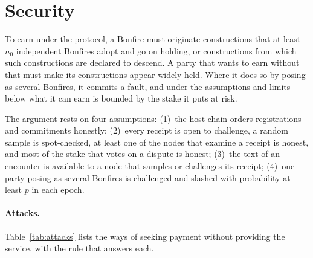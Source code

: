 \section{Security}\label{sec:security}

\begin{proposition}\label{prop:service}
To earn under the protocol, a Bonfire must originate constructions that at least $n_0$ independent Bonfires adopt
and go on holding, or constructions from which such constructions are declared to descend. A party that wants to
earn without that must make its constructions appear widely held. Where it does so by posing as several Bonfires,
it commits a fault, and under the assumptions and limits below what it can earn is bounded by the stake it puts at
risk.
\end{proposition}

The argument rests on four assumptions: (1)~the host chain orders registrations and commitments honestly; (2)~every
receipt is open to challenge, a random sample is spot-checked, at least one of the nodes that examine a receipt is
honest, and most of the stake that votes on a dispute is honest; (3)~the text of an encounter is available to a
node that samples or challenges its receipt; (4)~one party posing as several Bonfires is challenged and slashed
with probability at least $p$ in each epoch.

\paragraph{Attacks.} Table~\ref{tab:attacks} lists the ways of seeking payment without providing the service, with
the rule that answers each.

